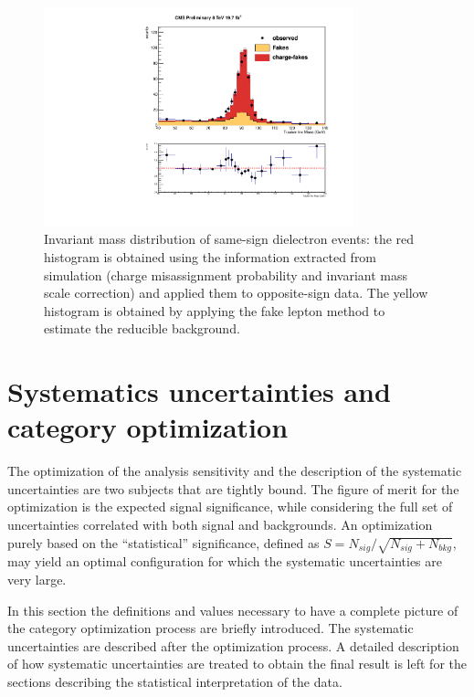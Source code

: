 \begin{figure}
  \begin{center}
  \includegraphics[width=0.8\textwidth]{4_Analisys/pics/8TeV/plots/zee/EE_Charge_Flip_xcheck_trk_invMass.pdf}
  \caption{Invariant mass distribution of same-sign dielectron events: the red histogram is obtained using the information extracted from simulation
(charge misassignment probability and invariant mass scale correction) and applied them to opposite-sign data. The yellow histogram is obtained by applying the fake lepton method to estimate the reducible background.}
  \label{fig:control_Zee}
  \end{center}
\end{figure}

\section{Systematics uncertainties and category optimization}
\label{sec:systematics}

The optimization of the analysis sensitivity and the description of the systematic uncertainties are two subjects that are tightly bound. The figure of merit for %
the optimization is the expected signal significance, while considering the full set of uncertainties correlated with both signal and backgrounds. An optimization purely based on the ``statistical'' significance, defined as $S = N_{sig} / \sqrt{N_{sig} + N_{bkg}}$, may yield an optimal configuration for which the systematic uncertainties are very large.

In this section the definitions and values necessary to have a complete picture of the category optimization process are briefly introduced. The systematic uncertainties are described after the optimization process.
A detailed description of how systematic uncertainties are treated to obtain the final result is left for the sections describing the statistical interpretation of the data.


